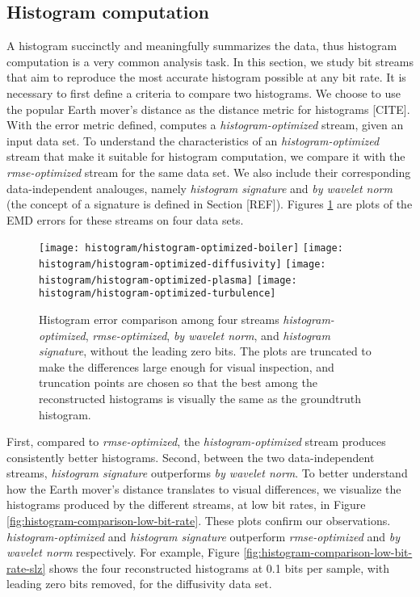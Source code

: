 
\subsection{Histogram computation}
\label{sec:histogram}

A histogram succinctly and meaningfully summarizes the data, thus histogram computation is a very
common analysis task. In this section, we study bit streams that aim to reproduce the most accurate
histogram possible at any bit rate. It is necessary to first define a criteria to compare two
histograms. We choose to use the popular Earth mover's distance as the distance metric for
histograms [CITE]. With the error metric defined,  computes a
\emph{histogram-optimized} stream, given an input data set. To understand the characteristics of an
\emph{histogram-optimized} stream that make it suitable for histogram computation, we compare it
with the \emph{rmse-optimized} stream for the same data set. We also include their corresponding
data-independent analouges, namely \emph{histogram signature} and \emph{by wavelet norm} (the
concept of a signature is defined in Section [REF]). Figures \ref{fig:histogram-stream-comparison}
are plots of the EMD errors for these streams on four data sets.

\begin{figure}[h]
	\centering
	{\texttt{[image: histogram/histogram-optimized-boiler]}}
	{\texttt{[image: histogram/histogram-optimized-diffusivity]}}
	{\texttt{[image: histogram/histogram-optimized-plasma]}}
	{\texttt{[image: histogram/histogram-optimized-turbulence]}}
	\caption{Histogram error comparison among four streams \emph{histogram-optimized},
	\emph{rmse-optimized}, \emph{by wavelet norm}, and \emph{histogram signature}, without the leading
	zero bits. The plots are truncated to make the differences large enough for visual inspection, and
	truncation points are chosen so that the best among the reconstructed histograms is visually the
	same as the groundtruth histogram. }
	\label{fig:histogram-stream-comparison}
\end{figure}

First, compared to \emph{rmse-optimized}, the \emph{histogram-optimized} stream produces
consistently better histograms. Second, between the two data-independent streams, \emph{histogram
signature} outperforms \emph{by wavelet norm}. To better understand how the Earth mover's distance
translates to visual differences, we visualize the histograms produced by the different streams, at
low bit rates, in Figure \ref{fig:histogram-comparison-low-bit-rate}. These plots confirm our
observations.
\emph{histogram-optimized} and \emph{histogram signature}
outperform \emph{rmse-optimized} and \emph{by wavelet norm} respectively. For example, Figure
\ref{fig:histogram-comparison-low-bit-rate-slz} shows the four reconstructed histograms at 0.1 bits
per sample, with leading zero bits removed, for the diffusivity data set.

